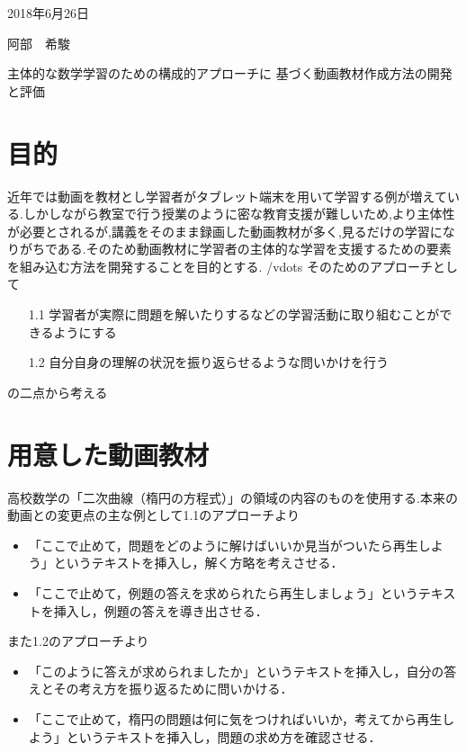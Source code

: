 \documentclass[a4j,10pt]{jsarticle}
\begin{document}
\begin{flushright} %
2018年6月26日

阿部　希駿
\end{flushright}

\begin{center}
\Large{主体的な数学学習のための構成的アプローチに
基づく動画教材作成方法の開発と評価}
\end{center}

\section{目的}
\label{sec:kihon}
近年では動画を教材とし学習者がタブレット端末を用いて学習する例が増えている.しかしながら教室で行う授業のように密な教育支援が難しいため,より主体性が必要とされるが,講義をそのまま録画した動画教材が多く,見るだけの学習になりがちである.そのため動画教材に学習者の主体的な学習を支援するための要素を組み込む方法を開発することを目的とする.
/vdots
そのためのアプローチとして
\begin{enumerate}
\item[1.1] 学習者が実際に問題を解いたりするなどの学習活動に取り組むことができるようにする
\item[1.2] 自分自身の理解の状況を振り返らせるような問いかけを行う
\end{enumerate}
の二点から考える

\section{用意した動画教材}
高校数学の「二次曲線（楕円の方程式）」の領域の内容のものを使用する.本来の動画との変更点の主な例として1.1のアプローチより

\begin{itemize}
 \item 「ここで止めて，問題をどのように解けばいいか見当がついたら再生しよう」というテキストを挿入し，解く方略を考えさせる．
 \item 「ここで止めて，例題の答えを求められたら再生しましょう」というテキストを挿入し，例題の答えを導き出させる． 
\end{itemize}

また1.2のアプローチより
\begin{itemize}
 \item 「このように答えが求められましたか」というテキストを挿入し，自分の答えとその考え方を振り返るために問いかける．
 \item 「ここで止めて，楕円の問題は何に気をつければいいか，考えてから再生しよう」というテキストを挿入し，問題の求め方を確認させる． 
\end{itemize}
\end{document}
